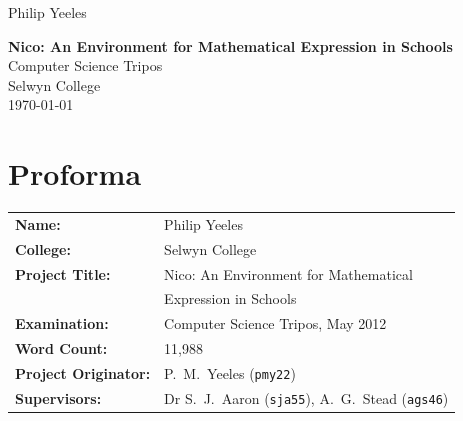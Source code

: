 \documentclass[12pt,twoside,notitlepage,xetex]{report}
\begin{document}
\nocite{*}




\pagestyle{empty}

\hfill{\Large Philip Yeeles}

\vspace*{60mm}
\begin{center}
\LARGE
{\bf \bigsf Nico: An Environment for Mathematical Expression in Schools}\\
\vspace*{5mm}
Computer Science Tripos\\
\vspace*{5mm}
Selwyn College\\
\vspace*{5mm}
\today %
\end{center}

\cleardoublepage


\setcounter{page}{1}
\pagestyle{plain}

\chapter*{Proforma}

{\large
\begin{tabular}{ll}
\bf Name:               & Philip Yeeles                                                   \\
\bf College:            & Selwyn College                                                  \\
\bf Project Title:      & Nico: An Environment for Mathematical\\
                        & Expression in Schools \\
\bf Examination:        & Computer Science Tripos, May 2012                               \\
\bf Word Count:         & 11,988\footnotemark[1]                                          \\
\bf Project Originator: & P.~M.~Yeeles (\verb¬pmy22¬)                                    \\
\bf Supervisors:        & Dr S.~J.~Aaron (\verb¬sja55¬), A.~G.~Stead (\verb¬ags46¬)    \\
\end{tabular}
}
\end{document}
